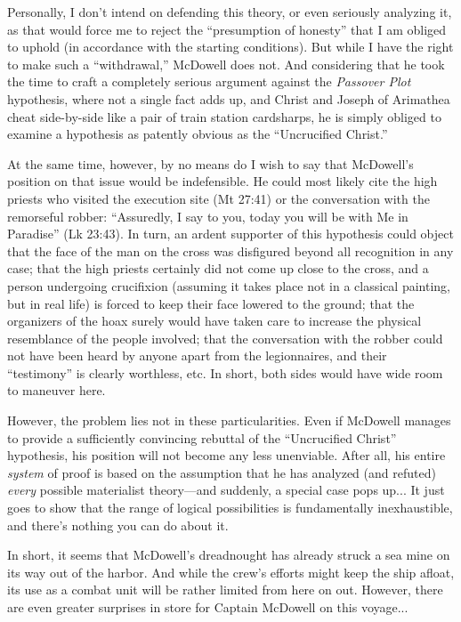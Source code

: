 Personally, I don't intend on defending this theory, or even seriously analyzing it, as that would force me to reject the ``presumption of honesty'' that I am obliged to uphold (in accordance with the starting conditions). But while I have the right to make such a ``withdrawal,'' McDowell does not. And considering that he took the time to craft a completely serious argument against the \emph{Passover Plot} hypothesis, where not a single fact adds up, and Christ and Joseph of Arimathea cheat side-by-side like a pair of train station cardsharps, he is simply obliged to examine a hypothesis as patently obvious as the ``Uncrucified Christ.''

At the same time, however, by no means do I wish to say that McDowell's position on that issue would be indefensible. He could most likely cite the high priests who visited the execution site (Mt 27:41) or the conversation with the remorseful robber: ``Assuredly, I say to you, today you will be with Me in Paradise'' (Lk 23:43). In turn, an ardent supporter of this hypothesis could object that the face of the man on the cross was disfigured beyond all recognition in any case; that the high priests certainly did not come up close to the cross, and a person undergoing crucifixion (assuming it takes place not in a classical painting, but in real life) is forced to keep their face lowered to the ground; that the organizers of the hoax surely would have taken care to increase the physical resemblance of the people involved; that the conversation with the robber could not have been heard by anyone apart from the legionnaires, and their ``testimony'' is clearly worthless, etc. In short, both sides would have wide room to maneuver here.

However, the problem lies not in these particularities. Even if McDowell manages to provide a sufficiently convincing rebuttal of the ``Uncrucified Christ'' hypothesis, his position will not become any less unenviable. After all, his entire \emph{system} of proof is based on the assumption that he has analyzed (and refuted) \emph{every} possible materialist theory---and suddenly, a special case pops up... It just goes to show that the range of logical possibilities is fundamentally inexhaustible, and there's nothing you can do about it.

In short, it seems that McDowell's dreadnought has already struck a sea mine on its way out of the harbor. And while the crew's efforts might keep the ship afloat, its use as a combat unit will be rather limited from here on out. However, there are even greater surprises in store for Captain McDowell on this voyage...